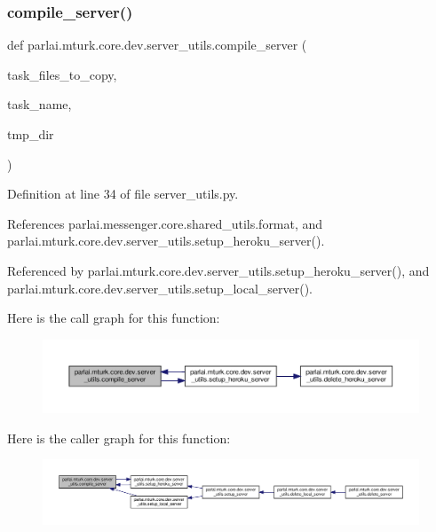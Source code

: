 \subsubsection{\texorpdfstring{compile\+\_\+server()}{compile\_server()}}
{\footnotesize\ttfamily def parlai.\+mturk.\+core.\+dev.\+server\+\_\+utils.\+compile\+\_\+server (\begin{DoxyParamCaption}\item[{}]{task\+\_\+files\+\_\+to\+\_\+copy,  }\item[{}]{task\+\_\+name,  }\item[{}]{tmp\+\_\+dir }\end{DoxyParamCaption})}



Definition at line 34 of file server\+\_\+utils.\+py.



References parlai.\+messenger.\+core.\+shared\+\_\+utils.\+format, and parlai.\+mturk.\+core.\+dev.\+server\+\_\+utils.\+setup\+\_\+heroku\+\_\+server().



Referenced by parlai.\+mturk.\+core.\+dev.\+server\+\_\+utils.\+setup\+\_\+heroku\+\_\+server(), and parlai.\+mturk.\+core.\+dev.\+server\+\_\+utils.\+setup\+\_\+local\+\_\+server().

Here is the call graph for this function\+:
\nopagebreak
\begin{figure}[H]
\begin{center}
\leavevmode
\includegraphics[width=350pt]{namespaceparlai_1_1mturk_1_1core_1_1dev_1_1server__utils_ab2ee72bd56197de749229032b05254da_cgraph}
\end{center}
\end{figure}
Here is the caller graph for this function\+:
\nopagebreak
\begin{figure}[H]
\begin{center}
\leavevmode
\includegraphics[width=350pt]{namespaceparlai_1_1mturk_1_1core_1_1dev_1_1server__utils_ab2ee72bd56197de749229032b05254da_icgraph}
\end{center}
\end{figure}
\mbox{\label{namespaceparlai_1_1mturk_1_1core_1_1dev_1_1server__utils_a876e990f1f5e670ff9c89869bdd1f1f6}} 
